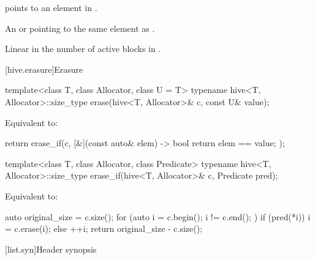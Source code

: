 \begin{itemdescr}
\pnum
\expects
{} points to an element in .

\pnum
\returns
An  or 
pointing to the same element as .

\pnum
\complexity
Linear in the number of active blocks in .
\end{itemdescr}

[hive.erasure]{Erasure}

%
\begin{itemdecl}
template<class T, class Allocator, class U = T>
  typename hive<T, Allocator>::size_type
    erase(hive<T, Allocator>& c, const U& value);
\end{itemdecl}

\begin{itemdescr}
\pnum
\effects
Equivalent to:
\begin{codeblock}
return erase_if(c, [&](const auto& elem) -> bool { return elem == value; });
\end{codeblock}
\end{itemdescr}

%
\begin{itemdecl}
template<class T, class Allocator, class Predicate>
  typename hive<T, Allocator>::size_type
    erase_if(hive<T, Allocator>& c, Predicate pred);
\end{itemdecl}

\begin{itemdescr}
\pnum
\effects
Equivalent to:
\begin{codeblock}
auto original_size = c.size();
for (auto i = c.begin(); i != c.end(); ) {
  if (pred(*i)) {
    i = c.erase(i);
  } else {
    ++i;
  }
}
return original_size - c.size();
\end{codeblock}
\end{itemdescr}

[list.syn]{Header  synopsis}

